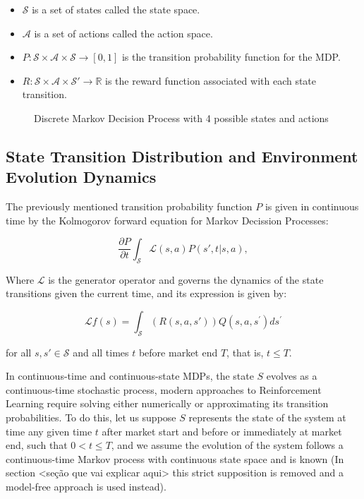 \begin{itemize}
	\item $\mathcal{S}$ is a set of states called the state space.
	\item $\mathcal{A}$ is a set of actions called the action space.
	\item $P: \mathcal{S} \times \mathcal{A} \times \mathcal{S} \to [0, 1]$ is the transition probability function for the MDP.
	\item $R: \mathcal{S} \times \mathcal{A} \times \mathcal{S}' \rightarrow \mathbb{R}$ is the reward function associated with each state transition.
\end{itemize}

\begin{figure}[H]
	\centering
	
	\caption{Discrete Markov Decision Process with 4 possible states and actions}
	\label{fig:mdp}
\end{figure}

\subsection{State Transition Distribution and Environment Evolution Dynamics}

The previously mentioned transition probability function $P$ is given in continuous time by the Kolmogorov forward equation for Markov Decission Processes:

\begin{equation}
	\frac{\partial P}{\partial t} \int_{\mathcal{S}} \mathcal{L}(s, a) P(s', t | s, a),
\end{equation}

Where $\mathcal{L}$ is the generator operator and governs the dynamics of the state transitions given the current time, and its expression is given by:

\begin{equation}
	\mathcal{L} f(s)=\int_{\mathcal{S}}(R(s, a, s')) Q\left(s, a, s^{\prime}\right) d s^{\prime}
\end{equation}

for all $s, s' \in \mathcal{S}$ and all times $t$ before market end $T$, that is, $t \le T$. 

In continuous-time and continuous-state MDPs, the state $S$ evolves as a continuous-time stochastic process, modern approaches to Reinforcement Learning require solving either numerically or approximating its transition probabilities. To do this, let us suppose $S$ represents the state of the system at time any given time $t$ after market start and before  or immediately at market end, such that $0 < t \leq T$, and we assume the evolution of the system follows a continuous-time Markov process with continuous state space and is known (In section <seção que vai explicar aqui> this strict supposition is removed and a model-free approach is used instead).


